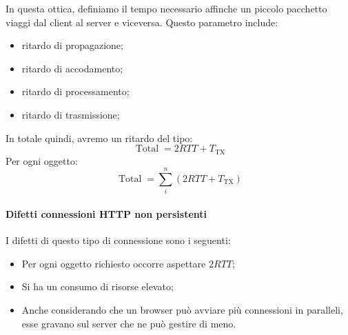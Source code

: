 \documentclass{book}
\newcommand{\tmop}[1]{\ensuremath{\operatorname{#1}}}
\newcommand{\tmtextbf}[1]{\text{{\bfseries{#1}}}}
\begin{document}
In questa ottica, definiamo \tmtextbf{RTT- Round Trip-Time} il tempo
necessario affinche un piccolo pacchetto viaggi dal client al server e
viceversa. Questo parametro include:
\begin{itemize}
  \item ritardo di propagazione;
  
  \item ritardo di accodamento;
  
  \item ritardo di processamento;
  
  \item ritardo di trasmissione;
\end{itemize}
{}

In totale quindi, avremo un ritardo del tipo:
\[ \tmop{Total} = 2 RTT + T_{\tmop{TX}} \]
Per ogni oggetto:
\[ \tmop{Total} = \sum_i^n (2 RTT + T_{\tmop{TX}}) \]

\paragraph{Difetti connessioni HTTP non persistenti}

I difetti di questo tipo di connessione sono i seguenti:
\begin{itemize}
  \item Per ogni oggetto richiesto occorre aspettare $2 RTT$;
  
  \item Si ha un consumo di risorse elevato;
  
  \item Anche considerando che un browser pu{\`o} avviare pi{\`u} connessioni
  in paralleli, esse gravano sul server che ne pu{\`o} gestire di meno.
\end{itemize}
\end{document}
